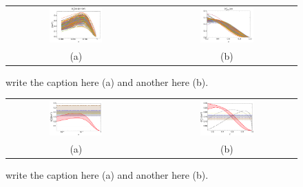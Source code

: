 \documentclass[aps,preprintnumbers,showpacs,nofootinbib,superscriptaddress,floatfix]{revtex4}
\begin{document}
\begin{figure}[h!]
\centering
\begin{tabular}{ccc}
\includegraphics[width=0.40\textwidth]{plots/Parameters_and_Curves/kT2av_curves_at1GeV_flINDEP.pdf}
&\hspace{0.001cm}
&
\includegraphics[width=0.40\textwidth]{plots/Parameters_and_Curves/PT2av_curves_at1GeV_flINDEP.pdf}
\\
(a) && (b)
\end{tabular}
\caption{write the caption here (a) and another here (b).}
\label{f:avmomenta_all_rep}
\end{figure}
\begin{figure}[h!]
\centering
\begin{tabular}{ccc}
\includegraphics[width=0.40\textwidth]{plots/Parameters_and_Curves/kT2av_Compare_with_other_extractions_flINDEP.pdf}
&\hspace{0.001cm}
&
\includegraphics[width=0.40\textwidth]{plots/Parameters_and_Curves/PT2av_Compare_with_other_extractions_flINDEP.pdf}
\\
(a) && (b)
\end{tabular}
\caption{write the caption here (a) and another here (b).}
\label{f:avmomenta_68CL}
\end{figure}
\end{document}
